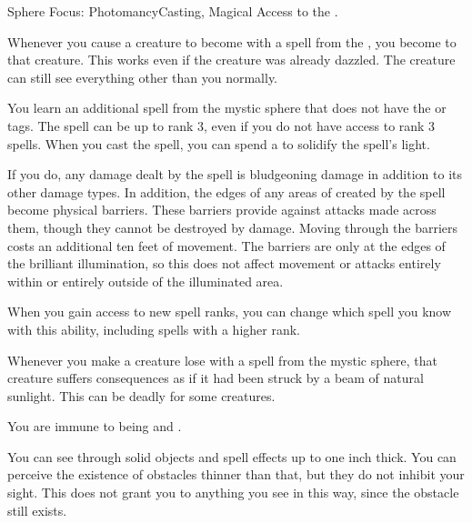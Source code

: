     \begin{magicalfeat}{Sphere Focus: Photomancy}{Casting, Magical}
        \featpre Access to the  .

         Whenever you cause a creature to become \dazzled with a spell from the  , you  become  to that creature.
        This works even if the creature was already dazzled.
        The creature can still see everything other than you normally.

         You learn an additional spell from the  mystic sphere that does not have the  or  tags.
        The spell can be up to rank 3, even if you do not have access to rank 3 spells.
        When you cast the spell, you can spend a  to solidify the spell's light.

        If you do, any damage dealt by the spell is bludgeoning damage in addition to its other damage types.
        In addition, the edges of any areas of  created by the spell become physical barriers.
        These barriers provide  against attacks made across them, though they cannot be destroyed by damage.
        Moving through the barriers costs an additional ten feet of movement.
        The barriers are only at the edges of the brilliant illumination, so this does not affect movement or attacks entirely within or entirely outside of the illuminated area.

        When you gain access to new spell ranks, you can change which spell you know with this ability, including spells with a higher rank.

         Whenever you make a creature lose  with a spell from the  mystic sphere, that creature suffers consequences as if it had been struck by a beam of natural sunlight.
        This can be deadly for some creatures.

         You are immune to being \dazzled and \blinded.

         You can see through solid objects and spell effects up to one inch thick.
        You can perceive the existence of obstacles thinner than that, but they do not inhibit your sight.
        This does not grant you  to anything you see in this way, since the obstacle still exists.
    \end{magicalfeat}

